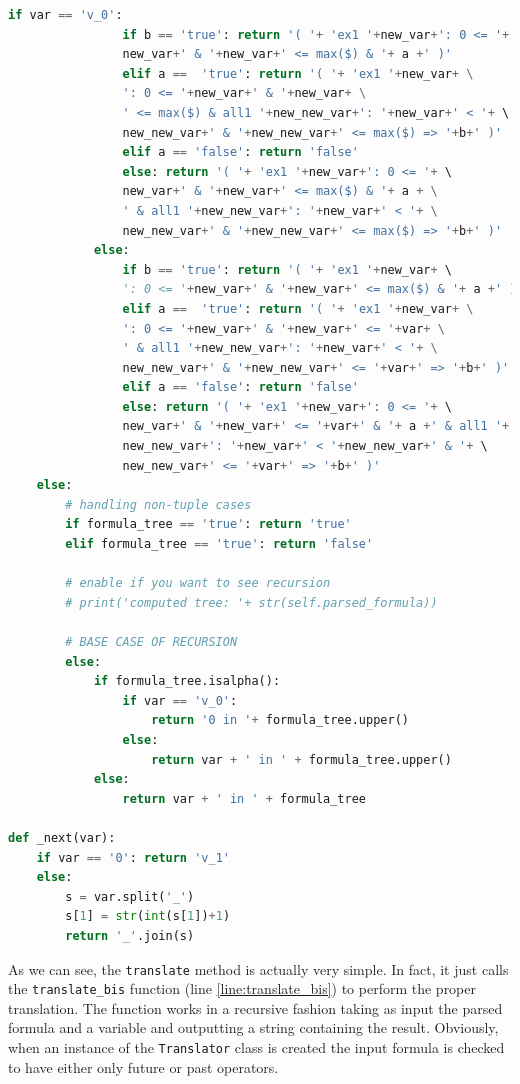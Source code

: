 \begin{lstlisting}[language=Python, style=Python, escapechar = £,  label={code:ltlf2dfa-translate-method}, caption={The \texttt{translate} method.}]
            if var == 'v_0':
                if b == 'true': return '( '+ 'ex1 '+new_var+': 0 <= '+ \ 
                new_var+' & '+new_var+' <= max($) & '+ a +' )'
                elif a ==  'true': return '( '+ 'ex1 '+new_var+ \
                ': 0 <= '+new_var+' & '+new_var+ \
                ' <= max($) & all1 '+new_new_var+': '+new_var+' < '+ \ 
                new_new_var+' & '+new_new_var+' <= max($) => '+b+' )'
                elif a == 'false': return 'false'
                else: return '( '+ 'ex1 '+new_var+': 0 <= '+ \ 
                new_var+' & '+new_var+' <= max($) & '+ a + \
                ' & all1 '+new_new_var+': '+new_var+' < '+ \
                new_new_var+' & '+new_new_var+' <= max($) => '+b+' )'
            else:
                if b == 'true': return '( '+ 'ex1 '+new_var+ \ 
                ': 0 <= '+new_var+' & '+new_var+' <= max($) & '+ a +' )'
                elif a ==  'true': return '( '+ 'ex1 '+new_var+ \
                ': 0 <= '+new_var+' & '+new_var+' <= '+var+ \
                ' & all1 '+new_new_var+': '+new_var+' < '+ \
                new_new_var+' & '+new_new_var+' <= '+var+' => '+b+' )'
                elif a == 'false': return 'false'
                else: return '( '+ 'ex1 '+new_var+': 0 <= '+ \ 
                new_var+' & '+new_var+' <= '+var+' & '+ a +' & all1 '+ \ 
                new_new_var+': '+new_var+' < '+new_new_var+' & '+ \ 
                new_new_var+' <= '+var+' => '+b+' )'
    else:
        # handling non-tuple cases
        if formula_tree == 'true': return 'true'
        elif formula_tree == 'true': return 'false'

        # enable if you want to see recursion
        # print('computed tree: '+ str(self.parsed_formula))

        # BASE CASE OF RECURSION
        else:
            if formula_tree.isalpha():
                if var == 'v_0':
                    return '0 in '+ formula_tree.upper()
                else:
                    return var + ' in ' + formula_tree.upper()
            else:
                return var + ' in ' + formula_tree

def _next(var):
    if var == '0': return 'v_1'
    else:
        s = var.split('_')
        s[1] = str(int(s[1])+1)
        return '_'.join(s)
\end{lstlisting}
As we can see, the \texttt{translate} method is actually very simple. In fact, it just calls the \texttt{translate\_bis} function (line \ref{line:translate_bis}) to perform the proper translation. The function works in a recursive fashion taking as input the parsed formula and a variable and outputting a string containing the result. Obviously, when an instance of the \texttt{Translator} class is created the input formula is checked to have either only future or past operators.
